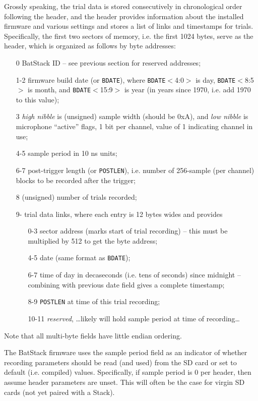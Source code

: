 \documentclass[letterpaper]{article}
\begin{document}
Grossly speaking, the trial data is stored consecutively in
chronological order following the header, and the header provides
information about the installed firmware and various settings and
stores a list of links and timestamps for trials. Specifically, the
first two sectors of memory, i.e. the first 1024 bytes, serve as the
header, which is organized as follows by byte addresses:
\begin{itemize}
\item[0] BatStack ID -- see previous section for reserved addresses;
\item[1-2] firmware build date (or \texttt{BDATE}), where
  \texttt{BDATE}$<$4:0$>$ is day, \texttt{BDATE}$<$8:5$>$ is month,
  and \texttt{BDATE}$<$15:9$>$ is year (in years since 1970, i.e. add
  1970 to this value);
\item[3] \textit{high nibble} is (unsigned) sample width (should be 0xA), and
  \textit{low nibble} is microphone ``active'' flags, 1 bit per channel, value
  of 1 indicating channel in use;
\item[4-5] sample period in 10 ns units;
\item[6-7] post-trigger length (or \texttt{POSTLEN}), i.e. number of
  256-sample (per channel) blocks to be recorded after the trigger;
\item[8] (unsigned) number of trials recorded;
\item[9-] trial data links, where each entry is 12 bytes wides and provides
  \begin{itemize}
  \item[0-3] sector address (marks start of trial recording) -- this must be multiplied by 512 to get the byte address;
  \item[4-5] date (same format as \texttt{BDATE});
  \item[6-7] time of day in decaseconds (i.e. tens of seconds) since
    midnight -- combining with previous date field gives a complete
    timestamp;
  \item[8-9] \texttt{POSTLEN} at time of this trial recording;
  \item[10-11] \textit{reserved}, \ldots likely will hold sample period at time of recording\ldots
  \end{itemize}
\end{itemize}
Note that all multi-byte fields have little endian ordering.

The BatStack firmware uses the sample period field as an indicator of
whether recording parameters should be read (and used) from the SD
card or set to default (i.e. compiled) values. Specifically, if sample
period is 0 per header, then assume header parameters are unset. This
will often be the case for virgin SD cards (not yet paired with a
Stack).
\end{document}
